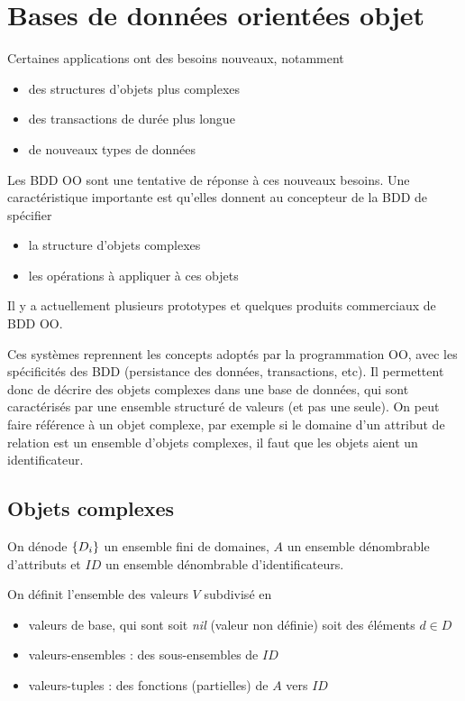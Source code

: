 \chapter{Bases de données orientées objet}

Certaines applications ont des besoins nouveaux, notamment

\begin{itemize}
	\item des structures d'objets plus complexes
	\item des transactions de durée plus longue
	\item de nouveaux types de données
\end{itemize}

Les BDD OO sont une tentative de réponse à ces nouveaux besoins. Une caractéristique importante est qu'elles donnent au concepteur de la BDD de spécifier

\begin{itemize}
	\item la structure d'objets complexes
	\item les opérations à appliquer à ces objets
\end{itemize}

Il y a actuellement plusieurs prototypes et quelques produits commerciaux de BDD OO.

Ces systèmes reprennent les concepts adoptés par la programmation OO, avec les spécificités des BDD (persistance des données, transactions, etc). Il permettent donc de décrire des objets complexes dans une base de données, qui sont caractérisés par une ensemble structuré de valeurs (et pas une seule). On peut faire référence à un objet complexe, par exemple si le domaine d'un attribut de relation est un ensemble d'objets complexes, il faut que les objets aient un identificateur.

	\section{Objets complexes}
	
	On dénode $\lbrace D_i \rbrace$ un ensemble fini de domaines, $A$ un ensemble dénombrable d'attributs et $ID$ un ensemble dénombrable d'identificateurs.
	
	On définit l'ensemble des valeurs $V$ subdivisé en
	
	\begin{itemize}
		\item valeurs de base, qui sont soit \textit{nil} (valeur non définie) soit des éléments $d \in D$
		\item valeurs-ensembles : des sous-ensembles de $ID$
		\item valeurs-tuples : des fonctions (partielles) de $A$ vers $ID$
	\end{itemize}
	
